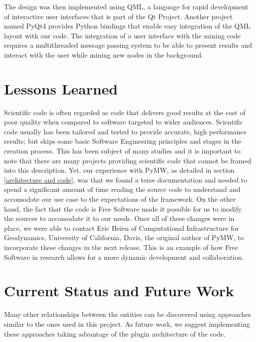 \documentclass{sig-alternate}
\begin{document}
The design was then implemented using QML, a language for rapid development of interactive user interfaces that is part
of the Qt Project. Another project named PyQt4 provides Python bindings that enable easy integration of the QML layout
with our code. The integration of a user interface with the mining code requires a multithreaded message passing system
to be able to present results and interact with the user while mining new nodes in the background.

\section{Lessons Learned}
\label{mistakes}

Scientific code is often regarded as code that delivers good results at the cost of poor quality when compared to
software targeted to wider audiences. Scientific code usually has been tailored and tested to provide accurate, high
performance results; but skips some basic Software Engineering principles and stages in the creation process. This has
been subject of many studies \cite{Li:2011:RSS:1985782.1985789,Phadke:2005:PRM:1145319.1145337} and it is important to
note that there are many projects providing scientific code that cannot be framed into this description. Yet, our
experience with PyMW, as detailed in section \ref{architecture and code}, was that we found a terse documentation and
needed to spend a significant amount of time reading the source code to understand and accomodate our use case to the
expectations of the framework. On the other hand, the fact that the code is Free Software made it possible for us to
modify the sources to accomodate it to our needs. Once all of these changes were in place, we were able to contact Eric
Heien of Computational Infrastructure for Geodynamics, University of California, Davis, the original author of PyMW, to
incorporate these changes in the next release. This is an example of how Free Software in research allows for a more
dynamic development and collaboration.

\section{Current Status and Future Work}
\label{current status}

Many other relationships between the entities can be discovered using
approaches similar to the ones used in this project. As future work, we
suggest implementing these approaches taking advantage of the plugin
architecture of the code.
\end{document}
